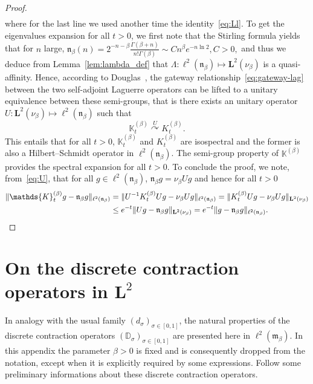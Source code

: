 \documentclass[10pt]{amsart}
\theoremstyle{definition}\newtheorem{defi}[theo]{Definition}\newtheorem{rema}[theo]{Remark}\newtheorem{exam}[theo]{Example}\newtheorem{exem}[theo]{Example}\newtheorem{nota}[theo]{Notation}
\newcommand{\fm}{\mathfrak{m}}
\newcommand{\fn}{\mathfrak{n}}
\newcommand{\dLs}{{\discret{K}}}
\newcommand{\Ls}{K}
\newcommand{\esL}{\mathbf{L}}
\newcommand{\esLd}{\ell}
\newcommand{\discret}[1]{\mathds{#1}}
\newcommand{\Ks}{\discret{K}}
\newcommand{\Gate}[3]{#1\stackrel{#2}{\curvearrowright}#3}
\begin{document}
\begin{proof}
\begin{align*}
\end{align*}
where for the last line we used another time the identity~\eqref{eq:Ll}. To get the eigenvalues expansion for all $t>0$, we first note that the Stirling formula yields that for $n$ large, $\fn_\beta(n)= 2^{-n-\beta}\frac{\Gamma(\beta+n)}{n!\Gamma(\beta)}\sim C n^{\beta} e^{-n \ln 2}, C>0,$ and thus we deduce from Lemma~\ref{lem:lambda_def} that $\Lambda : \ell^2({\fn_{\beta}}) \mapsto \esL^2(\nu_{\beta})$ is a quasi-affinity. Hence, according to Douglas~\cite{Douglas}, the gateway relationship~\eqref{eq:gateway-lag} between the two self-adjoint Laguerre operators can be lifted to a unitary equivalence between these semi-groups, that is there exists an unitary operator $U: \esL^2(\nu_{\beta})\mapsto \ell^2(\fn_{\beta})$ such that
\begin{equation}\label{eq:U}
\Gate{\dLs_{t}^{(\beta)}}{U}{\Ls_{t}^{(\beta)}}.
\end{equation}
This entails that for all $t>0$, $\Ks^{(\beta)}_t$ and $\Ls^{(\beta)}_t$ are isospectral and the former is also a Hilbert--Schmidt operator in $\esLd^2(\fn_{\beta})$. The semi-group property of $\Ks^{(\beta)}$ provides the spectral expansion for all $t>0$. To conclude the proof, we note, from~\eqref{eq:U}, that for all $ g \in \esLd^2(\fn_{\beta}) $, $\fn_{\beta} g=\nu_{\beta}U g$ and hence for all $t>0$
\begin{align*}
\|\Ks^{(\beta)}_tg-\fn_{\beta} g\|_{\ell^2(\fn_{\beta})} &= \|U^{-1}\Ls^{(\beta)}_tUg-\nu_{\beta}U g\|_{\ell^2(\fn_{\beta})} = \|\Ls^{(\beta)}_tUg-\nu_{\beta}U g\|_{\esL^2(\nu_{\beta})} \\
&\leq e^{-t} \|Ug-\fn_{\beta} g\|_{\esL^2(\nu_{\beta})} =e^{-t} \|g-\fn_{\beta} g\|_{\ell^2(\fn_{\beta})}.\qedhere
\end{align*}
\end{proof}


\appendix
\section{On the discrete contraction operators in \texorpdfstring{$\esL^2$}{L2}}\label{otdco}

In analogy with the usual family $(d_\sigma)_{\sigma\in[0,1]}$, the natural properties of the discrete contraction operators $(\discret{D}_\sigma)_{\sigma\in[0,1]}$ are presented here in $\esLd^2(\fm_{\beta})$. In this appendix the parameter $\beta>0$ is fixed and is consequently dropped from the notation, except when it is explicitly required by some expressions. Follow some preliminary informations about these discrete contraction operators.
\end{document}
